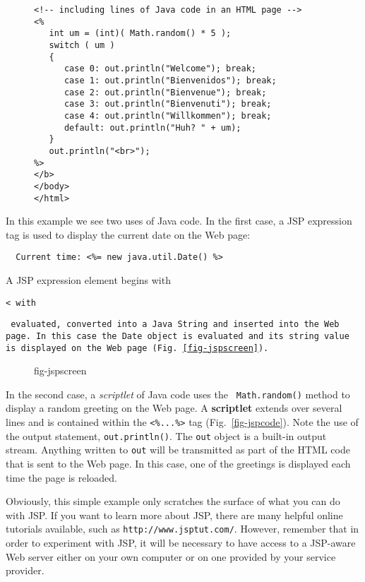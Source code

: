 {{\begin{figure}[h!]
\begin{jjjlisting}
\begin{lstlisting}
<!-- including lines of Java code in an HTML page -->
<%
   int um = (int)( Math.random() * 5 );
   switch ( um )
   {
      case 0: out.println("Welcome"); break;
      case 1: out.println("Bienvenidos"); break;
      case 2: out.println("Bienvenue"); break;
      case 3: out.println("Bienvenuti"); break;
      case 4: out.println("Willkommen"); break;
      default: out.println("Huh? " + um);
   }
   out.println("<br>");
%>
</b>
</body>
</html>
\end{lstlisting}
\end{jjjlisting}
\end{figure}


In this example we see two uses of Java
code.  In the first case, a JSP expression tag is used to display the
current date on the Web page:

\begin{jjjlisting}
\begin{lstlisting}
  Current time: <%= new java.util.Date() %>
\end{lstlisting}
\end{jjjlisting}

\noindent A JSP expression element begins with {\tt <%
with {\tt %
evaluated, converted into a Java {\tt String} and inserted into the
Web page.  In this case the {\tt Date} object is evaluated and its
string value is displayed on the Web page (Fig.~\ref{fig-jspscreen}).

\begin{figure}[tb]
 {fig-jspscreen}
\end{figure}

In the second case, a {\em scriptlet} of Java code uses the {\tt
Math.random()} method to display a random greeting on the Web page.  A
{\bf scriptlet} extends over several lines and is contained within the
{\tt <\%...\%>} tag (Fig.~\ref{fig-jspcode}).  Note the use of the
output statement, {\tt out.println()}. The {\tt out} object is a
built-in output stream.  Anything written to {\tt out} will be
transmitted as part of the HTML code that is sent to the Web page. In
this case, one of the greetings is displayed each time the page is
reloaded.

Obviously, this simple example only scratches the surface of what you
can do with JSP.  If you want to learn more about JSP, there are many
helpful online tutorials available, such as {\tt http://www.jsptut.com/}.
However, remember that in order to experiment with JSP, it will be
necessary to have access to a JSP-aware Web server either on your
own computer or on one provided by your service provider.

}}}}
